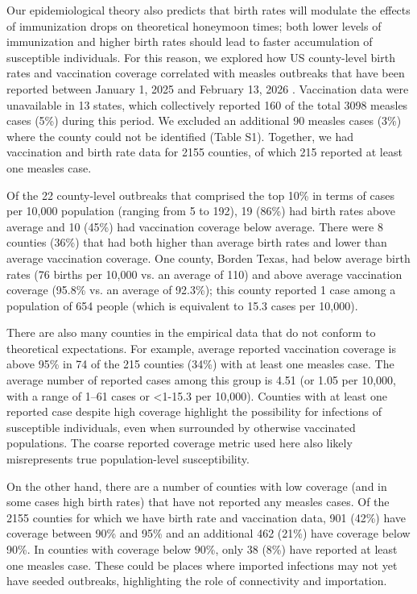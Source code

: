 Our epidemiological theory also predicts that birth rates will modulate the effects of immunization drops on theoretical honeymoon times; both lower levels of immunization and higher birth rates should lead to faster accumulation of susceptible individuals. For this reason, we explored how US county-level birth rates and vaccination coverage correlated with measles outbreaks that have been reported between January 1, 2025 and February 13, 2026 \citep{JHUMeaslesTracking2026}. Vaccination data were unavailable in 13 states, which collectively reported 160 of the total 3098 measles cases (5\%) during this period. We excluded an additional 90 measles cases (3\%) where the county could not be identified (Table S1). Together, we had vaccination and birth rate data for 2155 counties, of which 215 reported at least one measles case.

Of the 22 county-level outbreaks that comprised the top 10\% in terms of cases per 10,000 population (ranging from 5 to 192), 19 (86\%) had birth rates above average and 10 (45\%) had vaccination coverage below average. There were 8 counties (36\%) that had both higher than average birth rates and lower than average vaccination coverage. One county, Borden Texas, had below average birth rates (76 births per 10,000 vs. an average of 110) and above average vaccination coverage (95.8\% vs. an average of 92.3\%); this county reported 1 case among a population of 654 people (which is equivalent to 15.3 cases per 10,000).

There are also many counties in the empirical data that do not conform to theoretical expectations. For example, average reported vaccination coverage is above 95\% in 74 of the 215 counties (34\%) with at least one measles case. The average number of reported cases among this group is 4.51 (or 1.05 per 10,000, with a range of 1--61 cases or \textless1-15.3 per 10,000). Counties with at least one reported case despite high coverage highlight the possibility for infections of susceptible individuals, even when surrounded by otherwise vaccinated populations. The coarse reported coverage metric used here also likely misrepresents true population-level susceptibility.

On the other hand, there are a number of counties with low coverage (and in some cases high birth rates) that have not reported any measles cases. Of the 2155 counties for which we have birth rate and vaccination data, 901 (42\%) have coverage between 90\% and 95\% and an additional 462 (21\%) have coverage below 90\%. In counties with coverage below 90\%, only 38 (8\%) have reported at least one measles case. These could be places where imported infections may not yet have seeded outbreaks, highlighting the role of connectivity and importation.

